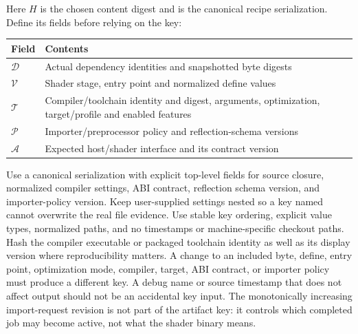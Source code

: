 Here \(H\) is the chosen content digest and  is the canonical recipe serialization. Define its fields before relying on the key:

{\def\LTcaptype{none} %
\begin{longtable}[]{@{}
  >{\raggedright\arraybackslash}p{}
  >{\raggedright\arraybackslash}p{}@{}}
\toprule\noalign{}
\begin{minipage}[b]{\linewidth}\raggedright
Field
\end{minipage} & \begin{minipage}[b]{\linewidth}\raggedright
Contents
\end{minipage} \\
\midrule\noalign{}
\endhead
\bottomrule\noalign{}
\endlastfoot
\(\mathcal D\) & Actual dependency identities and snapshotted byte digests \\
\(\mathcal V\) & Shader stage, entry point and normalized define values \\
\(\mathcal T\) & Compiler/toolchain identity and digest, arguments, optimization, target/profile and enabled features \\
\(\mathcal P\) & Importer/preprocessor policy and reflection-schema versions \\
\(\mathcal A\) & Expected host/shader interface and its contract version \\
\end{longtable}
}

Use a canonical serialization with explicit top-level fields for source closure, normalized compiler settings, ABI contract, reflection schema version, and importer-policy version. Keep user-supplied settings nested so a key named  cannot overwrite the real file evidence. Use stable key ordering, explicit value types, normalized paths, and no timestamps or machine-specific checkout paths. Hash the compiler executable or packaged toolchain identity as well as its display version where reproducibility matters. A change to an included byte, define, entry point, optimization mode, compiler, target, ABI contract, or importer policy must produce a different key. A debug name or source timestamp that does not affect output should not be an accidental key input. The monotonically increasing import-request revision is not part of the artifact key: it controls which completed job may become active, not what the shader binary means.

